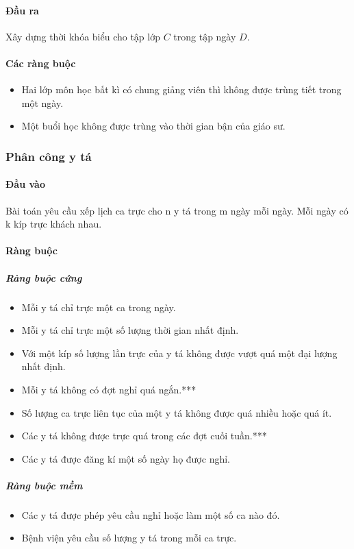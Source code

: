 \documentclass[a4paper,12pt]{report}
\begin{document}
\paragraph{Đầu ra}
Xây dựng thời khóa biểu cho tập lớp $C$ trong tập ngày $D$.
\paragraph{Các ràng buộc}
\begin{itemize}
\item Hai lớp môn học bất kì có chung giảng viên thì không được trùng tiết trong một ngày.
\item Một buổi học không được trùng vào thời gian bận của giáo sư\cite{CBLS}.
\end{itemize}
\subsubsection{Phân công y tá}
\paragraph{Đầu vào}
Bài toán yêu cầu xếp lịch ca trực cho n y tá trong m ngày mỗi ngày. Mỗi ngày có k kíp trực khách nhau.  
\paragraph{Ràng buộc}
\subparagraph{Ràng buộc cứng}
\begin{itemize}
\item Mỗi y tá chỉ trực một ca trong ngày.
\item Mỗi y tá chỉ trực một số lượng thời gian nhất định.
\item Với một kíp số lượng lần trực của y tá không được vượt quá một đại lượng nhất định.
\item Mỗi y tá không có đợt nghỉ quá ngắn.***
\item Số lượng ca trực liên tục của một y tá không được quá nhiều hoặc quá ít.
\item Các y tá không được trực quá trong các đợt cuối tuần.***
\item Các y tá được đăng kí một số ngày họ được nghỉ.
\end{itemize}
\subparagraph{Ràng buộc mềm}
\begin{itemize}
\item Các y tá được phép yêu cầu nghỉ hoặc làm một số ca nào đó.
\item Bệnh viện yêu cầu số lượng y tá trong mỗi ca trực.
\end{itemize}
\end{document}
